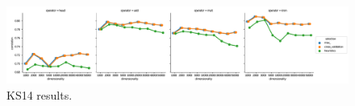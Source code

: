 \begin{figure}
  \centering

    \includegraphics[width=\textwidth]{supplement/figures/ks14-results}
  \caption{KS14 results.}
  \label{fig:ks14-results}
\end{figure}

